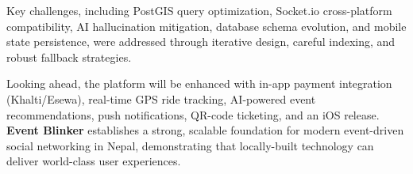 Key challenges, including PostGIS query optimization, Socket.io cross-platform compatibility, AI hallucination mitigation, database schema evolution, and mobile state persistence, were addressed through iterative design, careful indexing, and robust fallback strategies.

Looking ahead, the platform will be enhanced with in-app payment integration (Khalti/Esewa), real-time GPS ride tracking, AI-powered event recommendations, push notifications, QR-code ticketing, and an iOS release. \textbf{Event Blinker} establishes a strong, scalable foundation for modern event-driven social networking in Nepal, demonstrating that locally-built technology can deliver world-class user experiences.